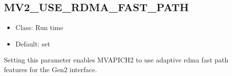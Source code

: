 % 
\subsection{MV2\_USE\_RDMA\_FAST\_PATH}
\label{def:nem-disable-rfp}
\begin{itemize}
    \item Class: Run time
    \item Default: set
\end{itemize}
Setting this parameter enables MVAPICH2 to use adaptive rdma fast path features
for the Gen2 interface.





% 
% 

